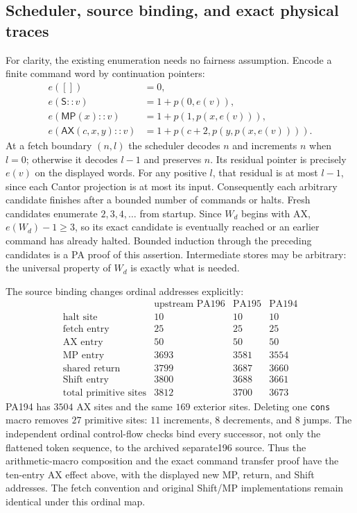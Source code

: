\subsection{Scheduler, source binding, and exact physical traces}

For clarity, the existing enumeration needs no fairness assumption.
Encode a finite command word by continuation pointers:
\begin{align*}
 e([])&=0,\\
 e(\mathsf S::v)&=1+p(0,e(v)),\\
 e(\mathsf{MP}(x)::v)&=1+p(1,p(x,e(v))),\\
 e(\mathsf{AX}(c,x,y)::v)&=1+p(c+2,p(y,p(x,e(v)))).
\end{align*}
At a fetch boundary $(n,l)$ the scheduler decodes $n$ and increments
$n$ when $l=0$; otherwise it decodes $l-1$ and preserves $n$.
Its residual pointer is precisely $e(v)$ on the displayed words.
For any positive $l$, that residual is at most $l-1$, since each
Cantor projection is at most its input. Consequently each arbitrary
candidate finishes after a bounded number of commands or halts.
Fresh candidates enumerate $2,3,4,\ldots$ from startup.
Since $W_d$ begins with AX, $e(W_d)-1\ge3$, so its exact candidate
is eventually reached or an earlier command has already halted.
Bounded induction through the preceding candidates is a PA proof
of this assertion. Intermediate stores may be arbitrary: the
universal property of $W_d$ is exactly what is needed.

The source binding changes ordinal addresses explicitly:
\[
\begin{array}{l|rrr}
 &\text{upstream PA196}&\text{PA195}&\text{PA194}\\ \hline
 \text{halt site}&10&10&10\\
 \text{fetch entry}&25&25&25\\
 \text{AX entry}&50&50&50\\
 \text{MP entry}&3693&3581&3554\\
 \text{shared return}&3799&3687&3660\\
 \text{Shift entry}&3800&3688&3661\\
 \text{total primitive sites}&3812&3700&3673
\end{array}
\]
PA194 has $3504$ AX sites and the same $169$ exterior sites.
Deleting one \texttt{cons} macro removes $27$ primitive sites:
$11$ increments, $8$ decrements, and $8$ jumps. The independent
ordinal control-flow checks bind every successor, not only the
flattened token sequence, to the archived separate196 source.
Thus the arithmetic-macro composition and the exact command transfer
proof have the ten-entry AX effect above, with the displayed new
MP, return, and Shift addresses. The fetch convention and original
Shift/MP implementations remain identical under this ordinal map.

